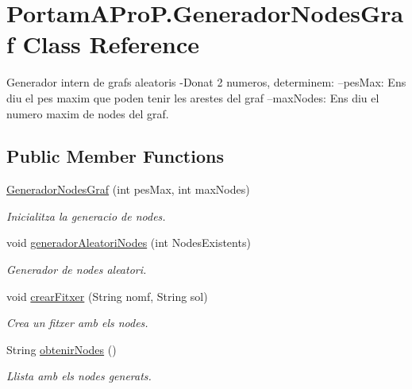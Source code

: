 \hypertarget{class_portam_a_pro_p_1_1_generador_nodes_graf}{}\section{Portam\+A\+Pro\+P.\+Generador\+Nodes\+Graf Class Reference}
\label{class_portam_a_pro_p_1_1_generador_nodes_graf}


Generador intern de grafs aleatoris -\/\+Donat 2 numeros, determinem\+: --pes\+Max\+: Ens diu el pes maxim que poden tenir les arestes del graf --max\+Nodes\+: Ens diu el numero maxim de nodes del graf.  


\subsection*{Public Member Functions}
\begin{DoxyCompactItemize}
\item 
\hyperlink{class_portam_a_pro_p_1_1_generador_nodes_graf_a0a254397d096732fe208ad9f70cf0a41}{Generador\+Nodes\+Graf} (int pes\+Max, int max\+Nodes)
\begin{DoxyCompactList}\small\item\em Inicialitza la generacio de nodes. \end{DoxyCompactList}\item 
void \hyperlink{class_portam_a_pro_p_1_1_generador_nodes_graf_aca80784e2f6b7a5ed13029e4dd993a44}{generador\+Aleatori\+Nodes} (int Nodes\+Existents)
\begin{DoxyCompactList}\small\item\em Generador de nodes aleatori. \end{DoxyCompactList}\item 
void \hyperlink{class_portam_a_pro_p_1_1_generador_nodes_graf_a426b43321777fd21fb46af7c63f27f07}{crear\+Fitxer} (String nomf, String sol)
\begin{DoxyCompactList}\small\item\em Crea un fitxer amb els nodes. \end{DoxyCompactList}\item 
String \hyperlink{class_portam_a_pro_p_1_1_generador_nodes_graf_a93b4ca31f2957719696490c11619de7c}{obtenir\+Nodes} ()
\begin{DoxyCompactList}\small\item\em Llista amb els nodes generats. \end{DoxyCompactList}\end{DoxyCompactItemize}


